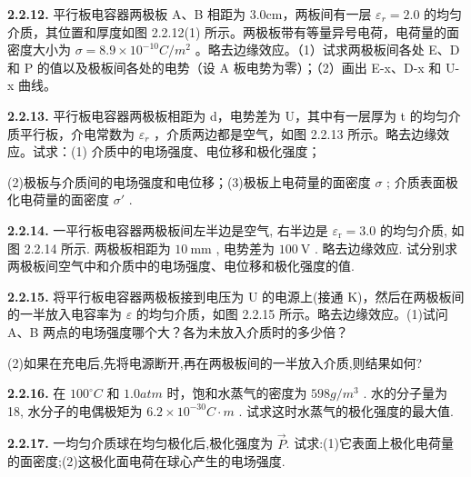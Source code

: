 \vfill
\newpage

\textbf{2.2.12.} 平行板电容器两极板 A、B 相距为 3.0cm，两板间有一层 $\varepsilon_{r}=2.0$ 的均匀介质，其位置和厚度如图 2.2.12(1) 所示。两极板带有等量异号电荷，电荷量的面密度大小为 $\sigma=8.9\times10^{-10}C/m^{2}$ 。略去边缘效应。（1）试求两极板间各处 E、D 和 P 的值以及极板间各处的电势（设 A 板电势为零）；（2）画出 E-x、D-x 和 U-x 曲线。

\begin{center}
\end{center}

\vfill
\newpage

\textbf{2.2.13.} 平行板电容器两极板相距为 d，电势差为 U，其中有一层厚为 t 的均匀介质平行板，介电常数为 $\varepsilon_{r}$ ，介质两边都是空气，如图 2.2.13 所示。略去边缘效应。试求：(1) 介质中的电场强度、电位移和极化强度；

(2)极板与介质间的电场强度和电位移；(3)极板上电荷量的面密度 $\sigma$ ; 介质表面极化电荷量的面密度 $\sigma'$ .

\vfill
\newpage

\textbf{2.2.14.} 一平行板电容器两极板间左半边是空气, 右半边是 $\varepsilon_{\mathrm{r}} = 3.0$ 的均匀介质, 如图 2.2.14 所示. 两极板相距为 $10 \mathrm{~mm}$ , 电势差为 $100 \mathrm{~V}$ . 略去边缘效应. 试分别求两极板间空气中和介质中的电场强度、电位移和极化强度的值.

\begin{center}
\end{center}

\vfill
\newpage

\textbf{2.2.15.} 将平行板电容器两极板接到电压为 U 的电源上(接通 K)，然后在两极板间的一半放入电容率为 $\varepsilon$ 的均匀介质，如图 2.2.15 所示。略去边缘效应。(1)试问 A、B 两点的电场强度哪个大？各为未放入介质时的多少倍？

(2)如果在充电后,先将电源断开,再在两极板间的一半放入介质,则结果如何?

\vfill
\newpage

\textbf{2.2.16.} 在 $100^{\circ}C$ 和 $1.0atm$ 时，饱和水蒸气的密度为 $598g/m^{3}$ . 水的分子量为 18, 水分子的电偶极矩为 $6.2 \times 10^{-30}C \cdot m$ . 试求这时水蒸气的极化强度的最大值.

\vfill
\newpage

\textbf{2.2.17.} 一均匀介质球在均匀极化后,极化强度为 $\vec{P}$. 试求:(1)它表面上极化电荷量的面密度;(2)这极化面电荷在球心产生的电场强度.

